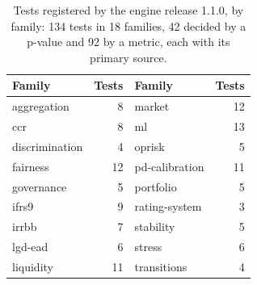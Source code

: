 \begin{table}[htbp]
\centering
\small
\caption{Tests registered by the engine release 1.1.0, by family: 134 tests in 18 families, 42 decided by a p-value and 92 by a metric, each with its primary source.}
\label{tab:catalogue}
\begin{tabular}{lrlr}
\toprule
Family & Tests & Family & Tests \\
\midrule
aggregation & 8 & market & 12 \\
ccr & 8 & ml & 13 \\
discrimination & 4 & oprisk & 5 \\
fairness & 12 & pd-calibration & 11 \\
governance & 5 & portfolio & 5 \\
ifrs9 & 9 & rating-system & 3 \\
irrbb & 7 & stability & 5 \\
lgd-ead & 6 & stress & 6 \\
liquidity & 11 & transitions & 4 \\
\bottomrule
\end{tabular}
\end{table}
